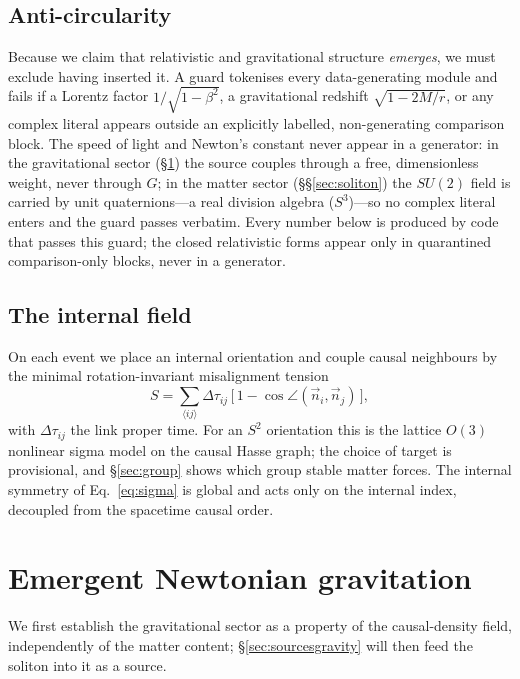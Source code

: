 \documentclass[aps,prd,reprint,nofootinbib,superscriptaddress,floatfix]{revtex4-2}
\theoremstyle{plain}
\newcommand{\su}[1]{SU(#1)}
\begin{document}
\subsection{Anti-circularity}\label{sec:guard}
Because we claim that relativistic and gravitational structure \emph{emerges}, we
must exclude having inserted it. A guard tokenises every data-generating module and
fails if a Lorentz factor $1/\sqrt{1-\beta^2}$, a gravitational redshift
$\sqrt{1-2M/r}$, or any complex literal appears outside an explicitly labelled,
non-generating comparison block. The speed of light and Newton's constant never
appear in a generator: in the gravitational sector (\S\ref{sec:gravity}) the source
couples through a free, dimensionless weight, never through $G$; in the matter sector
(\S\S\ref{sec:soliton}) the $\su2$ field is carried by unit quaternions---a real
division algebra ($S^3$)---so no complex literal enters and the guard passes
verbatim. Every number below is produced by code that passes this guard; the closed
relativistic forms appear only in quarantined comparison-only blocks, never in a
generator.

\subsection{The internal field}\label{sec:field}
On each event we place an internal orientation and couple causal neighbours by the
minimal rotation-invariant misalignment tension
\begin{equation}
S=\sum_{\langle ij\rangle}\Delta\tau_{ij}\,\big[\,1-\cos\angle(\vec n_i,\vec n_j)\,\big],
\label{eq:sigma}
\end{equation}
with $\Delta\tau_{ij}$ the link proper time. For an $S^2$ orientation this is the
lattice $O(3)$ nonlinear sigma model on the causal Hasse graph; the choice of target
is provisional, and \S\ref{sec:group} shows which group stable matter forces. The
internal symmetry of Eq.~\eqref{eq:sigma} is global and acts only on the internal
index, decoupled from the spacetime causal order.

\section{Emergent Newtonian gravitation}\label{sec:gravity}

We first establish the gravitational sector as a property of the causal-density
field, independently of the matter content; \S\ref{sec:sourcesgravity} will then feed
the soliton into it as a source.
\end{document}
